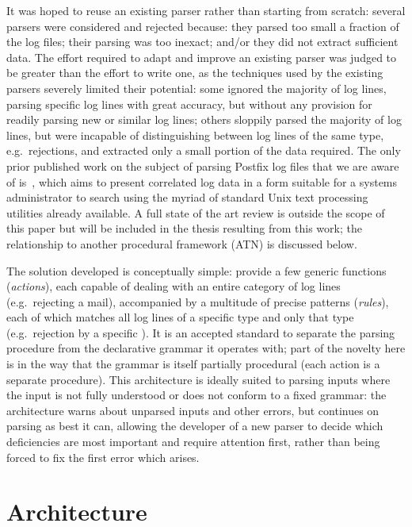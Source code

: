 \documentclass{svmult}
\begin{document}
It was hoped to reuse an existing parser rather than starting from scratch:
several parsers were considered and rejected because: they parsed too small
a fraction of the log files; their parsing was too inexact; and/or they did
not extract sufficient data.  The effort required to adapt and improve an
existing parser was judged to be greater than the effort to write one, as
the techniques used by the existing parsers severely limited their
potential: some ignored the majority of log lines, parsing specific log
lines with great accuracy, but without any provision for readily parsing
new or similar log lines; others sloppily parsed the majority of log lines,
but were incapable of distinguishing between log lines of the same type,
e.g.\ rejections, and extracted only a small portion of the data required.
The only prior published work on the subject of parsing Postfix log files
that we are aware of is~\cite{log-mail-analyser}, which aims to present
correlated log data in a form suitable for a systems administrator to
search using the myriad of standard Unix text processing utilities already
available.  A full state of the art review is outside the scope of this
paper but will be included in the thesis resulting from this work; the
relationship to another procedural framework (ATN) is discussed below.

The solution developed is conceptually simple: provide a few generic
functions (\textit{actions\/}), each capable of dealing with an entire
category of log lines (e.g.\ rejecting a mail), accompanied by a multitude
of precise patterns (\textit{rules\/}), each of which matches all log lines
of a specific type and only that type (e.g.\ rejection by a specific
\DNSBL{}).  It is an accepted standard to separate the parsing procedure
from the declarative grammar it operates with; part of the novelty here is
in the way that the grammar is itself partially procedural (each action is
a separate procedure).  This architecture is ideally suited to parsing
inputs where the input is not fully understood or does not conform to a
fixed grammar: the architecture warns about unparsed inputs and other
errors, but continues on parsing as best it can, allowing the developer of
a new parser to decide which deficiencies are most important and require
attention first, rather than being forced to fix the first error which
arises.

\section{Architecture}
\end{document}
